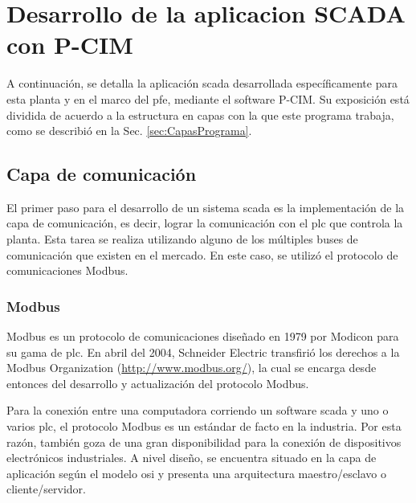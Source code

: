 \section{Desarrollo de la aplicacion SCADA con P-CIM}
A continuación, se detalla la aplicación \gls{scada} desarrollada 
específicamente para esta planta y en el marco del \gls{pfe}, mediante el
software P-CIM. Su exposición está dividida de acuerdo a la estructura en capas
con la que este programa trabaja, como se describió en la Sec.
\ref{sec:CapasPrograma}.

\subsection{Capa de comunicación}
\label{subsec:CapaComunicacion}
El primer paso para el desarrollo de un sistema \gls{scada} es la 
implementación de la capa de comunicación, es decir, lograr la 
comunicación con el \gls{plc} que controla la planta. Esta tarea se realiza
utilizando alguno de los múltiples buses de comunicación que existen en el
mercado. En este caso, se utilizó el protocolo de comunicaciones Modbus.

\subsubsection{Modbus}
Modbus es un protocolo de comunicaciones diseñado en 1979 por Modicon para su 
gama de \gls{plc}. En abril del 2004, Schneider Electric transfirió los 
derechos a la Modbus Organization (\url{http://www.modbus.org/}), la cual se 
encarga desde entonces del desarrollo y actualización del protocolo Modbus.

Para la conexión entre una computadora corriendo un software \gls{scada} y uno
o varios \gls{plc}, el protocolo Modbus es un estándar de facto en la industria.
Por esta razón, también goza de una gran disponibilidad para la conexión de
dispositivos electrónicos industriales. A nivel diseño, se encuentra situado en 
la capa de aplicación según el modelo \gls{osi} y presenta una arquitectura 
maestro/esclavo o cliente/servidor.



